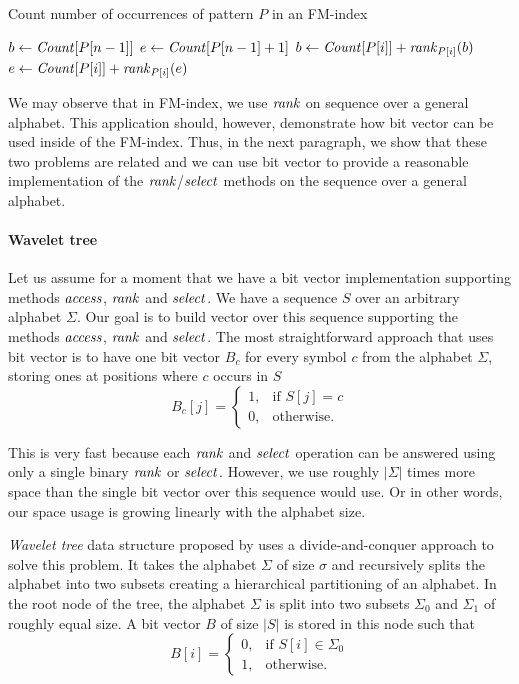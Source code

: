 \begin{algorithm}
\caption{Count number of occurrences of pattern $P$ in an FM-index}\label{alg:fm_index_count}
$b \gets \mathit{Count}[P[n-1]]$\;
$e \gets \mathit{Count}[P[n-1]+1]$\;
 {
	$b \gets \mathit{Count}[P[i]] + \mathit{rank}_{P[i]}(b)$\;
	$e \gets \mathit{Count}[P[i]] + \mathit{rank}_{P[i]}(e)$\;
}
\end{algorithm}

We may observe that in FM-index, we use $\mathit{rank}$ on sequence over a general alphabet. This application
should, however, demonstrate how bit vector can be used inside of the FM-index. Thus, in the next
paragraph, we show that these two problems are related and we can use bit vector to provide a
reasonable implementation of the $\mathit{rank}$/$\mathit{select}$ methods on the sequence over a general alphabet.

\paragraph{Wavelet tree}
\label{section:WaweletTree}

Let us assume for a moment that we have a bit vector implementation supporting methods $\mathit{access}$,
$\mathit{rank}$ and $\mathit{select}$. We have a sequence $S$ over an arbitrary alphabet $\Sigma$. Our goal is to
build vector over this sequence supporting the methods $\mathit{access}$, $\mathit{rank}$ and $\mathit{select}$. The most
straightforward approach that uses bit vector is to have one bit vector $B_c$ for every symbol $c$
from the alphabet $\Sigma$, storing ones at positions where $c$ occurs in $S$
\[
    B_c[j]= 
\begin{cases}
	1,& \text{if } S[j]=c \\
    0,& \text{otherwise.}
\end{cases}
\]

This is very fast because each $\mathit{rank}$ and $\mathit{select}$ operation can be answered using only a single
binary $\mathit{rank}$ or $\mathit{select}$. However, we use roughly $|\Sigma|$ times more space than the single bit
vector over this sequence would use. Or in other words, our space usage is growing linearly with the
alphabet size.

\textit{Wavelet tree} data structure proposed by \cite{grossi2003high} uses a divide-and-conquer
approach to solve this problem. It takes the alphabet $\Sigma$ of size $\sigma$ and recursively
splits the alphabet into two subsets creating a hierarchical partitioning of an alphabet. In the
root node of the tree, the alphabet $\Sigma$ is split into two subsets $\Sigma_0$ and $\Sigma_1$
of roughly equal size. A bit vector $B$ of size $|S|$ is stored in this node such that
\[
    B[i]= 
\begin{cases}
    0,& \text{if } S[i]\in \Sigma_0\\
    1,              & \text{otherwise.}
\end{cases}
\]

